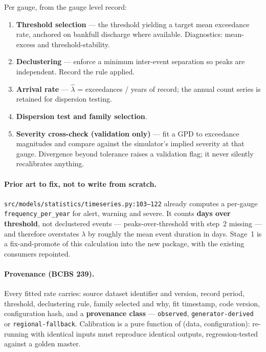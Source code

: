 \documentclass[11pt]{article}
\begin{document}
Per gauge, from the gauge level record:

\begin{enumerate}[nosep]
  \item \textbf{Threshold selection} --- the threshold yielding a target mean
        exceedance rate, anchored on bankfull discharge where available.
        Diagnostics: mean-excess and threshold-stability.
  \item \textbf{Declustering} --- enforce a minimum inter-event separation so
        peaks are independent. Record the rule applied.
  \item \textbf{Arrival rate} --- $\hat{\lambda}$ = exceedances / years of
        record; the annual count series is retained for dispersion testing.
  \item \textbf{Dispersion test and family selection}.
  \item \textbf{Severity cross-check (validation only)} --- fit a GPD to
        exceedance magnitudes and compare against the simulator's implied
        severity at that gauge. Divergence beyond tolerance raises a validation
        flag; it never silently recalibrates anything.
\end{enumerate}

\paragraph{Prior art to fix, not to write from scratch.}
\texttt{src/models/statistics/timeseries.py:103--122} already computes a
per-gauge \texttt{frequency\_per\_year} for alert, warning and severe. It counts
\textbf{days over threshold}, not declustered events --- peaks-over-threshold
with step~2 missing --- and therefore overstates $\lambda$ by roughly the mean
event duration in days. Stage~1 is a fix-and-promote of this calculation into
the new package, with the existing consumers repointed.

\paragraph{Provenance (BCBS 239).}
Every fitted rate carries: source dataset identifier and version, record period,
threshold, declustering rule, family selected and why, fit timestamp, code
version, configuration hash, and a \textbf{provenance class} ---
\texttt{observed}, \texttt{generator-derived} or \texttt{regional-fallback}.
Calibration is a pure function of (data, configuration): re-running with
identical inputs must reproduce identical outputs, regression-tested against a
golden master.
\end{document}
